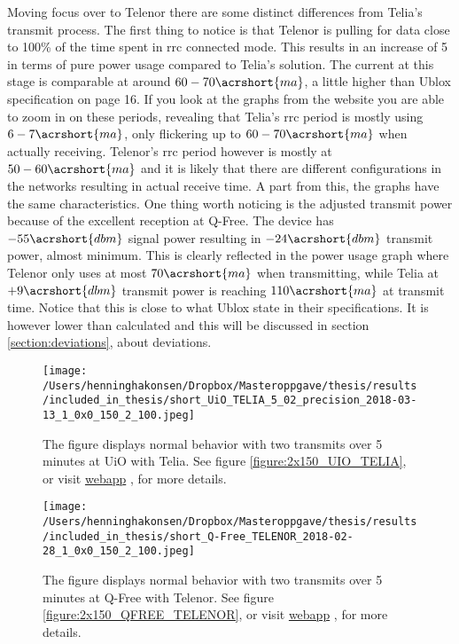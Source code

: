 \documentclass[USenglish]{ifimaster}  %
\begin{document}
Moving focus over to Telenor there are some distinct differences from Telia's transmit process. The first thing to notice is that Telenor is pulling for data close to 100\% of the time spent in \acrshort{rrc} connected mode. This results in an increase of 5 in terms of pure power usage compared to Telia's solution. The current at this stage is comparable at around ${60-70 \acrshort{ma}}$, a little higher than Ublox specification on page 16\cite{datasheet:ubloxchip}. If you look at the graphs from the website you are able to zoom in on these periods, revealing that Telia's \acrshort{rrc} period is mostly using ${6-7 \acrshort{ma}}$, only flickering up to ${60-70 \acrshort{ma}}$ when actually receiving. Telenor's \acrshort{rrc} period however is mostly at ${50-60 \acrshort{ma}}$ and it is likely that there are different configurations in the networks resulting in actual receive time.
A part from this, the graphs have the same characteristics. One thing worth noticing is the adjusted transmit power because of the excellent reception at Q-Free. The device has ${-55 \acrshort{dbm}}$ signal power resulting in ${-24 \acrshort{dbm}}$ transmit power, almost minimum. This is clearly reflected in the power usage graph where Telenor only uses at most ${70 \acrshort{ma}}$ when transmitting, while Telia at ${+9 \acrshort{dbm}}$ transmit power is reaching ${110 \acrshort{ma}}$ at transmit time. Notice that this is close to what Ublox state in their specifications. It is however lower than calculated and this will be discussed in section \vref{section:deviations}, about deviations.

\begin{figure}[H]
  \centering
  \texttt{[image: /Users/henninghakonsen/Dropbox/Masteroppgave/thesis/results/included\_in\_thesis/short\_UiO\_TELIA\_5\_02\_precision\_2018-03-13\_1\_0x0\_150\_2\_100.jpeg]}
  \caption[Short-term test - normal behavior, Telia]{The figure displays normal behavior with two transmits over 5 minutes at UiO with Telia. See figure \vref{figure:2x150_UIO_TELIA}, or visit \href{http://158.39.77.97:9000/\#/results/Q-Free\_TELENOR\_2018-02-28\_1\_0x0\_150\_2\_100}{webapp} \cite{online:result1}, for more details.}
  \label{figure:2x150_UIO_TELIA_SHORT}
\end{figure}

\begin{figure}[H]
  \centering
  \texttt{[image: /Users/henninghakonsen/Dropbox/Masteroppgave/thesis/results/included\_in\_thesis/short\_Q-Free\_TELENOR\_2018-02-28\_1\_0x0\_150\_2\_100.jpeg]}
  \caption[Short-term test - normal behavior, Telenor]{The figure displays normal behavior with two transmits over 5 minutes at Q-Free with Telenor. See figure \vref{figure:2x150_QFREE_TELENOR}, or visit \href{http://158.39.77.97:9000/\#/results/Q-Free\_TELENOR\_5.02\_2018-03-07\_0\_0x0\_40\_1\_200}{webapp} \cite{online:result2}, for more details.}
  \label{figure:2x150_QFREE_TELENOR_SHORT}
\end{figure}
\end{document}
